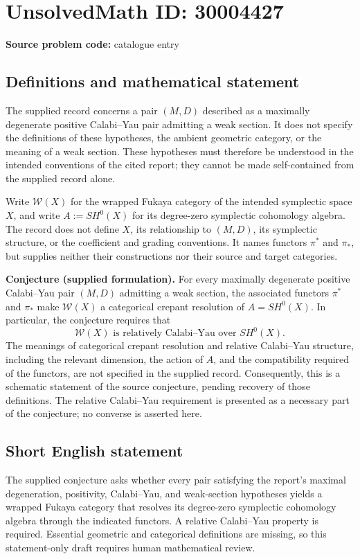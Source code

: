 \documentclass[11pt]{article}
\begin{document}
\section*{UnsolvedMath ID: 30004427}
\textbf{Source problem code:} catalogue entry
\subsection{Definitions and mathematical statement}
The supplied record concerns a pair \((M,D)\) described as a maximally degenerate positive Calabi--Yau pair admitting a weak section. It does not specify the definitions of these hypotheses, the ambient geometric category, or the meaning of a weak section. These hypotheses must therefore be understood in the intended conventions of the cited report; they cannot be made self-contained from the supplied record alone.

Write \(\mathcal W(X)\) for the wrapped Fukaya category of the intended symplectic space \(X\), and write \(A:=SH^0(X)\) for its degree-zero symplectic cohomology algebra. The record does not define \(X\), its relationship to \((M,D)\), its symplectic structure, or the coefficient and grading conventions. It names functors \(\pi^*\) and \(\pi_*\), but supplies neither their constructions nor their source and target categories.

\textbf{Conjecture (supplied formulation).} For every maximally degenerate positive Calabi--Yau pair \((M,D)\) admitting a weak section, the associated functors \(\pi^*\) and \(\pi_*\) make \(\mathcal W(X)\) a categorical crepant resolution of \(A=SH^0(X)\). In particular, the conjecture requires that
\[
\mathcal W(X)\text{ is relatively Calabi--Yau over }SH^0(X).
\]
The meanings of categorical crepant resolution and relative Calabi--Yau structure, including the relevant dimension, the action of \(A\), and the compatibility required of the functors, are not specified in the supplied record. Consequently, this is a schematic statement of the source conjecture, pending recovery of those definitions. The relative Calabi--Yau requirement is presented as a necessary part of the conjecture; no converse is asserted here.
\subsection{Short English statement}
The supplied conjecture asks whether every pair satisfying the report's maximal degeneration, positivity, Calabi--Yau, and weak-section hypotheses yields a wrapped Fukaya category that resolves its degree-zero symplectic cohomology algebra through the indicated functors. A relative Calabi--Yau property is required. Essential geometric and categorical definitions are missing, so this statement-only draft requires human mathematical review.
\end{document}
